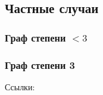 
\subsection{Частные случаи}
\subsubsection{Граф степени $< 3$}
\subsubsection{Граф степени 3}
Ссылки:~\cite{digraph_3}
